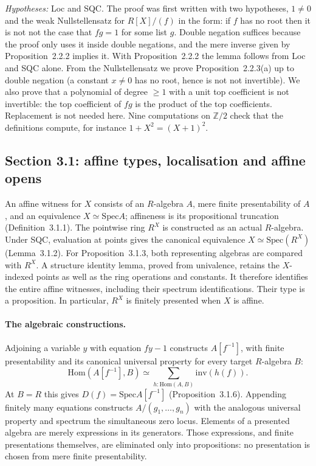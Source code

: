 \documentclass[11pt]{article}
\newcommand{\Spec}{\mathrm{Spec}}
\theoremstyle{remark}
\begin{document}
\emph{Hypotheses:} Loc and SQC. The proof was first written with two
hypotheses, $1\ne0$ and the weak Nullstellensatz for $R[X]/(f)$ in the
form: if $f$ has no root then it is not not the case that $fg=1$ for
some list $g$. Double negation suffices because the proof only uses it
inside double negations, and the mere inverse given by
Proposition~2.2.2 implies it. With Proposition~2.2.2 the lemma follows
from Loc and SQC alone. From the Nullstellensatz we prove
Proposition~2.2.3(a) up to double negation (a constant $x\ne 0$ has no
root, hence is not not invertible). We also prove that a polynomial of degree $\ge 1$ with a
unit top coefficient is not invertible: the top coefficient of $fg$ is
the product of the top coefficients. Replacement is not needed here.
Nine computations on $\mathbb{Z}/2$ check that the definitions compute,
for instance $1+X^2=(X+1)^2$.

\subsection*{Section 3.1: affine types, localisation and affine opens}

An affine witness for $X$ consists of an $R$-algebra $A$, mere finite
presentability of $A$, and an equivalence $X\simeq\Spec A$;
affineness is its propositional truncation (Definition~3.1.1).
The pointwise ring $R^X$ is constructed as an actual $R$-algebra.
Under SQC, evaluation at points gives the canonical equivalence
$X\simeq\Spec(R^X)$ (Lemma~3.1.2).
For Proposition~3.1.3, both representing algebras are compared with
$R^X$. A structure identity lemma, proved from univalence, retains
the $X$-indexed points as well as the ring operations and constants.
It therefore identifies the entire affine witnesses, including their
spectrum identifications. Their type is a proposition. In particular,
$R^X$ is finitely presented when $X$ is affine.

\paragraph{The algebraic constructions.}
Adjoining a variable $y$ with equation $fy-1$ constructs $A[f^{-1}]$,
with finite presentability and its canonical universal property for
every target $R$-algebra $B$:
\[
 \mathrm{Hom}(A[f^{-1}],B)
 \simeq \sum_{h:\mathrm{Hom}(A,B)}\mathrm{inv}(h(f)).
\]
At $B=R$ this gives $D(f)=\Spec A[f^{-1}]$ (Proposition~3.1.6).
Appending finitely many equations constructs $A/(g_1,\ldots,g_n)$
with the analogous universal property and spectrum the simultaneous
zero locus. Elements of a presented algebra are merely expressions in
its generators. Those expressions, and finite presentations themselves,
are eliminated only into propositions: no presentation is chosen from
mere finite presentability.
\end{document}
